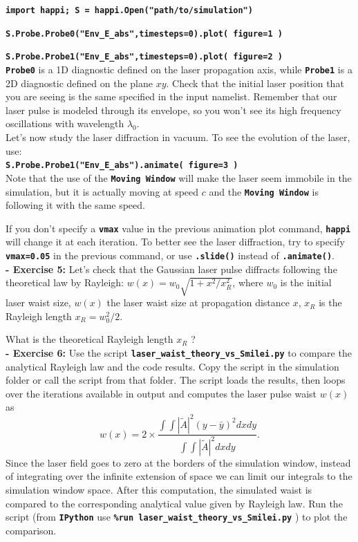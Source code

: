 \documentclass{article}
\newcommand{\commandline}[1]{\texttt{\textbf{#1}}}
\begin{document}
\commandline{import happi; S =  happi.Open("path/to/simulation")}

\commandline{S.Probe.Probe0("Env\_E\_abs",timesteps=0).plot( figure=1 )}

\commandline{S.Probe.Probe1("Env\_E\_abs",timesteps=0).plot( figure=2 )}\\

\commandline{Probe0} is a 1D diagnostic defined on the laser propagation axis, while \commandline{Probe1} is a 2D diagnostic defined on the plane $xy$. Check that the initial laser position that you are seeing is the same specified in the input namelist. Remember that our laser pulse is modeled through its envelope, so you won't see its high frequency oscillations with wavelength $\lambda_0$.\\

Let's now study the laser diffraction in vacuum. To see the evolution of the laser, use:\\ 

\commandline{S.Probe.Probe1("Env\_E\_abs").animate( figure=3 )}\\

Note that the use of the \commandline{Moving Window} will make the laser seem immobile in the simulation, but it is actually moving at speed $c$ and the \commandline{Moving Window} is following it with the same speed.

If you don't specify a \commandline{vmax} value in the previous animation plot command, \commandline{happi} will change it at each iteration. To better see the laser diffraction, try to  specify \commandline{vmax=0.05} in the previous command, or use \commandline{.slide()} instead of \commandline{.animate()}.\\

\textbf{ - Exercise  5:} Let's check that the Gaussian laser pulse diffracts following the theoretical law by Rayleigh: $w(x)=w_0\sqrt{1+x^2/x_R^2}$, where $w_0$ is the initial laser waist size, $w(x)$ the laser waist size at propagation distance $x$, $x_R$ is the Rayleigh length $x_R=w_0^2/2$. 

What is the theoretical Rayleigh length $x_R$ ?\\

\textbf{ - Exercise  6:} Use the script \commandline{laser\_waist\_theory\_vs\_Smilei.py} to compare the analytical Rayleigh law and the code results. Copy the script in the simulation folder or call the script from that folder. The script loads the results, then loops over the iterations available in output and computes the laser pulse waist $w(x)$ as 
\begin{equation}
w(x)=2\times\frac{\int\int|\tilde{A}|^2  (y-\bar{y})^2 dx dy}{\int\int |\tilde{A}|^2  dx dy}.
\end{equation} Since the laser field goes to zero at the borders of the simulation window, instead of integrating over the infinite extension of space we can limit our integrals to the simulation window space. After this computation, the simulated waist is compared to the corresponding analytical value given by Rayleigh law. Run the script (from \commandline{IPython} use \commandline{\%run laser\_waist\_theory\_vs\_Smilei.py} ) to plot the comparison.
\end{document}
